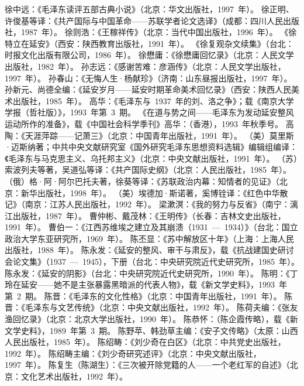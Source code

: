 \begin{thebibliography}{999}
\bibitem{}徐中远：《毛泽东读评五部古典小说》（北京：华文出版社，1997~年）。
\bibitem{}徐正明、许俊基等译：《共产国际与中国革命——苏联学者论文选译》（成都：四川人民出版社，1987~年）。
\bibitem{}徐则浩：《王稼祥传》（北京：当代中国出版社，1996~年）。
\bibitem{}《徐特立在延安》（西安：陕西教育出版社，1991~年）。
\bibitem{}《徐复观杂文续集》（台北：时报文化出版有限公司，1986~年）。
\bibitem{}徐懋庸：《徐懋庸回忆录》（北京：人民文学出版社，1982~年）。
\bibitem{}孙志远：《感谢苦难：彦涵传》（北京：人民文学出版社，1997~年）。
\bibitem{}孙春山：《无悔人生·杨献珍》（济南：山东昼报出版社，1997~年）。
\bibitem{}孙新元、尚德全编：《延安岁月——延安时期革命美术回忆录》（西安：陕西人民美术出版社，1985~年）。
\bibitem{}高华：《毛泽东与~1937~年的刘、洛之争》；载《南京大学学报（哲社版）》，1993~年第~3~期。
\bibitem{}《在道与势之间——毛泽东为发动延安整风运动所作的准备》，载《中国社会科学季刊》高华：（香港），1993~年秋季号。
\bibitem{}高陶：《天涯萍踪——记萧三》（北京：中国青年出版社，1991~年）。
\bibitem{}（美）莫里斯·迈斯纳著；中共中央文献研究室《国外研究毛泽东思想资料选辑》编辑组编译：《毛泽东与马克思主义、乌托邦主义》（北京：中央文献出版社，1991~年）。
\bibitem{}（苏）索波列夫等著，吴道弘等译：《共产国际史纲》（北京：人民出版社，1985~年）。
\bibitem{}（俄）格·阿·阿尔巴托夫著，徐葵等译：《苏联政治内幕：知情者的见证》（北京：新华出版社，1998~年）。
\bibitem{}（美）埃德加·斯诺著，奚博铨译：《红色中华散记》（南京：江苏人民出版社，1992~年）。
\bibitem{}梁漱溟：《我的努力与反省》（南宁：漓江出版社，1987~年）。
\bibitem{}曹仲彬、戴茂林：《王明传》（长春：吉林文史出版社，1991~年）。
\bibitem{}曹伯一：《江西苏维埃之建立及其崩溃（1931~—~1934）》（台北：国立政治大学东亚研究所，1969~年）。
\bibitem{}陈丕显：《苏中解放区十年》（上海：上海人民出版社，1988~年）。
\bibitem{}陈永发：《延安的整风、审干与肃反》，载《抗战建国史研讨会论文集》（1937~—~1945），下册（台北：中央研究院近代史研究所，1985~年）。
\bibitem{}陈永发：《延安的阴影》（台北：中央研究院近代史研究所，1990~年）。
\bibitem{}陈明：《丁玲在延安——她不是主张暴露黑暗派的代表人物》，载《新文学史料》，1993~年第~2~期。
\bibitem{}陈晋：《毛泽东的文化性格》（北京：中国青年出版社，1991~年）。
\bibitem{}陈晋：《毛泽东与文艺传统》（北京：中央文献出版社，1992~年）。
\bibitem{}陈荷夫编：《张友渔回忆录》（北京：北京大学出版社，1990~年）。
\bibitem{}陈恭怀：（陈企霞传略），载《新文学史料》，1989~年第~3~期。
\bibitem{}陈野苹、韩劲草主编：《安子文传略》（太原：山西人民出版社，1985~年）。
\bibitem{}陈绍畴：《刘少奇在白区》（北京：中共党史出版社，1992~年）。
\bibitem{}陈绍畴主编：《刘少奇研究述评》（北京：中央文献出版社，1997~年）。
\bibitem{}陈复生（陈湖生）：《三次被开除党籍的人——一个老红军的自述》（北京：文化艺术出版社，1992~年）。

\end{thebibliography}
